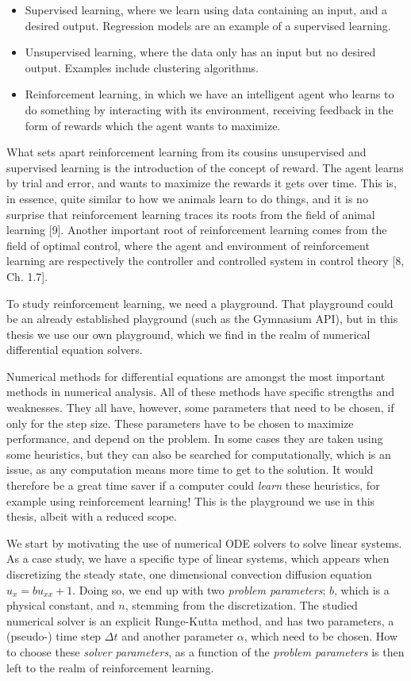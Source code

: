 \documentclass[
  letterpaper,
]{report}
\providecommand{\tightlist}{%
  \setlength{\itemsep}{0pt}\setlength{\parskip}{0pt}}\usepackage{longtable,booktabs,array}
\theoremstyle{definition}
\theoremstyle{plain}
\theoremstyle{definition}
\theoremstyle{remark}
\begin{document}
\begin{itemize}
\tightlist
\item
  Supervised learning, where we learn using data containing an input,
  and a desired output. Regression models are an example of a supervised
  learning.
\item
  Unsupervised learning, where the data only has an input but no desired
  output. Examples include clustering algorithms.
\item
  Reinforcement learning, in which we have an intelligent agent who
  learns to do something by interacting with its environment, receiving
  feedback in the form of rewards which the agent wants to maximize.
\end{itemize}

What sets apart reinforcement learning from its cousins unsupervised and
supervised learning is the introduction of the concept of reward. The
agent learns by trial and error, and wants to maximize the rewards it
gets over time. This is, in essence, quite similar to how we animals
learn to do things, and it is no surprise that reinforcement learning
traces its roots from the field of animal learning {[}9{]}. Another
important root of reinforcement learning comes from the field of optimal
control, where the agent and environment of reinforcement learning are
respectively the controller and controlled system in control theory
{[}8, Ch. 1.7{]}.

To study reinforcement learning, we need a playground. That playground
could be an already established playground (such as the Gymnasium API),
but in this thesis we use our own playground, which we find in the realm
of numerical differential equation solvers.

Numerical methods for differential equations are amongst the most
important methods in numerical analysis. All of these methods have
specific strengths and weaknesses. They all have, however, some
parameters that need to be chosen, if only for the step size. These
parameters have to be chosen to maximize performance, and depend on the
problem. In some cases they are taken using some heuristics, but they
can also be searched for computationally, which is an issue, as any
computation means more time to get to the solution. It would therefore
be a great time saver if a computer could \emph{learn} these heuristics,
for example using reinforcement learning! This is the playground we use
in this thesis, albeit with a reduced scope.

We start by motivating the use of numerical ODE solvers to solve linear
systems. As a case study, we have a specific type of linear systems,
which appears when discretizing the steady state, one dimensional
convection diffusion equation \(u_{x} = bu_{xx} +1\). Doing so, we end
up with two \emph{problem parameters}; \(b\), which is a physical
constant, and \(n\), stemming from the discretization. The studied
numerical solver is an explicit Runge-Kutta method, and has two
parameters, a (pseudo-) time step \(\Delta t\) and another parameter
\(\alpha\), which need to be chosen. How to choose these \emph{solver
parameters}, as a function of the \emph{problem parameters} is then left
to the realm of reinforcement learning.
\end{document}
